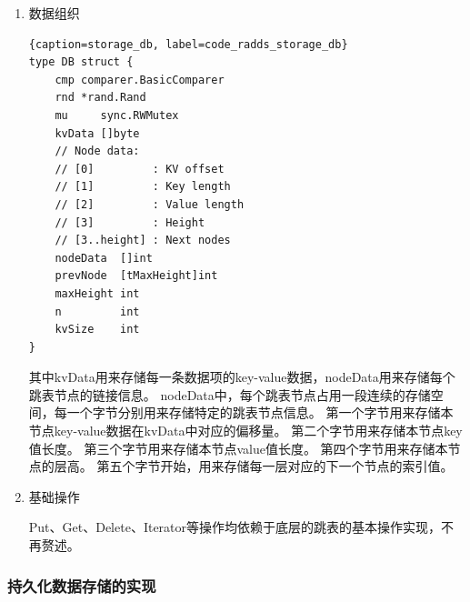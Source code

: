 \begin{enumerate}
			\item 数据组织
			
			\begin{lstlisting}{caption=storage_db, label=code_radds_storage_db}
type DB struct {
	cmp comparer.BasicComparer
	rnd *rand.Rand
	mu     sync.RWMutex
	kvData []byte
	// Node data:
	// [0]         : KV offset
	// [1]         : Key length
	// [2]         : Value length
	// [3]         : Height
	// [3..height] : Next nodes
	nodeData  []int
	prevNode  [tMaxHeight]int
	maxHeight int
	n         int
	kvSize    int
}
		\end{lstlisting}
				
			
			其中kvData用来存储每一条数据项的key-value数据，nodeData用来存储每个跳表节点的链接信息。
			nodeData中，每个跳表节点占用一段连续的存储空间，每一个字节分别用来存储特定的跳表节点信息。
			第一个字节用来存储本节点key-value数据在kvData中对应的偏移量。
			第二个字节用来存储本节点key值长度。
			第三个字节用来存储本节点value值长度。
			第四个字节用来存储本节点的层高。
			第五个字节开始，用来存储每一层对应的下一个节点的索引值。

		\item 基础操作
		
		Put、Get、Delete、Iterator等操作均依赖于底层的跳表的基本操作实现，不再赘述。
		\end{enumerate}

		\subsubsection{持久化数据存储的实现}


